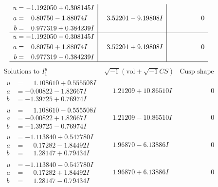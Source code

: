 \documentclass[1p]{elsarticle_modified}
\theoremstyle{definition}
\newcommand{\I}{\sqrt{-1}}
\begin{document}
$$\begin{array}{c|c|c}
\begin{aligned}
u &= -1.192050 + 0.308145 I \\
a &= \phantom{-}0.80750 - 1.88074 I \\
b &= \phantom{-}0.977319 + 0.384239 I\end{aligned}
 & \phantom{-}3.52201 - 9.19808 I & \phantom{-0.000000 } 0 \\ \hline\begin{aligned}
u &= -1.192050 - 0.308145 I \\
a &= \phantom{-}0.80750 + 1.88074 I \\
b &= \phantom{-}0.977319 - 0.384239 I\end{aligned}
 & \phantom{-}3.52201 + 9.19808 I & \phantom{-0.000000 } 0\\
 \hline 
 \end{array}$$\newpage$$\begin{array}{c|c|c}  
\text{Solutions to }I^u_{1}& \I (\text{vol} + \sqrt{-1}CS) & \text{Cusp shape}\\
 \hline 
\begin{aligned}
u &= \phantom{-}1.108610 + 0.555508 I \\
a &= -0.00822 - 1.82667 I \\
b &= -1.39725 + 0.76974 I\end{aligned}
 & \phantom{-}1.21209 + 10.86510 I & \phantom{-0.000000 } 0 \\ \hline\begin{aligned}
u &= \phantom{-}1.108610 - 0.555508 I \\
a &= -0.00822 + 1.82667 I \\
b &= -1.39725 - 0.76974 I\end{aligned}
 & \phantom{-}1.21209 - 10.86510 I & \phantom{-0.000000 } 0 \\ \hline\begin{aligned}
u &= -1.113840 + 0.547780 I \\
a &= \phantom{-}0.17282 - 1.84492 I \\
b &= \phantom{-}1.28147 + 0.79434 I\end{aligned}
 & \phantom{-}1.96870 - 6.13886 I & \phantom{-0.000000 } 0 \\ \hline\begin{aligned}
u &= -1.113840 - 0.547780 I \\
a &= \phantom{-}0.17282 + 1.84492 I \\
b &= \phantom{-}1.28147 - 0.79434 I\end{aligned}
 & \phantom{-}1.96870 + 6.13886 I & \phantom{-0.000000 } 0 \\ \hline\begin{aligned}

\end{aligned}
\end{array}$$
\end{document}
